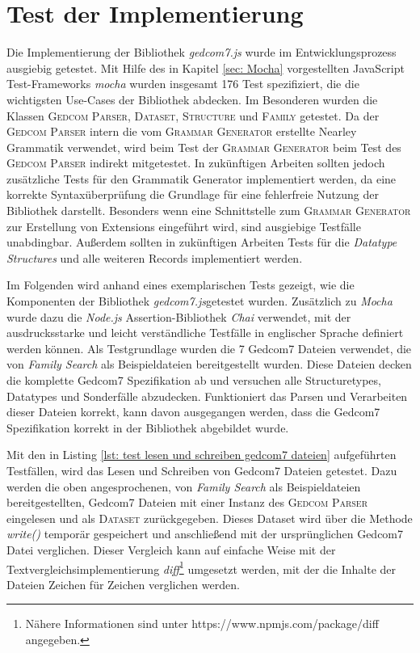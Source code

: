 \section{Test der Implementierung}
Die Implementierung der Bibliothek \textit{gedcom7.js} wurde im Entwicklungsprozess ausgiebig getestet. Mit Hilfe des in Kapitel \ref{sec: Mocha} vorgestellten JavaScript Test-Frameworks \textit{mocha} wurden insgesamt 176 Test spezifiziert, die die wichtigsten Use-Cases der Bibliothek abdecken. Im Besonderen wurden die Klassen \textsc{Gedcom Parser}, \textsc{Dataset}, \textsc{Structure} und \textsc{Family} getestet. Da der \textsc{Gedcom Parser} intern die vom \textsc{Grammar Generator} erstellte Nearley Grammatik verwendet, wird beim Test der \textsc{Grammar Generator} beim Test des \textsc{Gedcom Parser} indirekt mitgetestet. In zukünftigen Arbeiten sollten jedoch zusätzliche Tests für den Grammatik Generator implementiert werden, da eine korrekte Syntaxüberprüfung die Grundlage für eine fehlerfreie Nutzung der Bibliothek darstellt. Besonders wenn eine Schnittstelle zum \textsc{Grammar Generator} zur Erstellung von Extensions eingeführt wird, sind ausgiebige Testfälle unabdingbar. Außerdem sollten in zukünftigen Arbeiten Tests für die \textit{Datatype Structures} und alle weiteren Records implementiert werden. 


Im Folgenden wird anhand eines exemplarischen Tests gezeigt, wie die Komponenten der Bibliothek \textit{gedcom7.js}getestet wurden. Zusätzlich zu \textit{Mocha} wurde dazu die \textit{Node.js} Assertion-Bibliothek \textit{Chai} verwendet, mit der ausdrucksstarke und leicht verständliche Testfälle in englischer Sprache definiert werden können. Als Testgrundlage wurden die 7 Gedcom7 Dateien verwendet, die von \textit{Family Search} als Beispieldateien bereitgestellt wurden. Diese Dateien decken die komplette Gedcom7 Spezifikation ab und versuchen alle Structuretypes, Datatypes und Sonderfälle abzudecken. Funktioniert das Parsen und Verarbeiten dieser Dateien korrekt, kann davon ausgegangen werden, dass die Gedcom7 Spezifikation korrekt in der Bibliothek abgebildet wurde.


Mit den in Listing \ref{lst: test lesen und schreiben gedcom7 dateien} aufgeführten Testfällen, wird das Lesen und Schreiben von Gedcom7 Dateien getestet. Dazu werden die oben angesprochenen, von \textit{Family Search} als Beispieldateien bereitgestellten, Gedcom7 Dateien mit einer Instanz des \textsc{Gedcom Parser} eingelesen und als \textsc{Dataset} zurückgegeben. Dieses Dataset wird über die Methode \textit{write()} temporär gespeichert und anschließend mit der ursprünglichen Gedcom7 Datei verglichen. Dieser Vergleich kann auf einfache Weise mit der Textvergleichsimplementierung \textit{diff}\footnote{Nähere Informationen sind unter https://www.npmjs.com/package/diff angegeben.} umgesetzt werden, mit der die Inhalte der Dateien Zeichen für Zeichen verglichen werden. 


